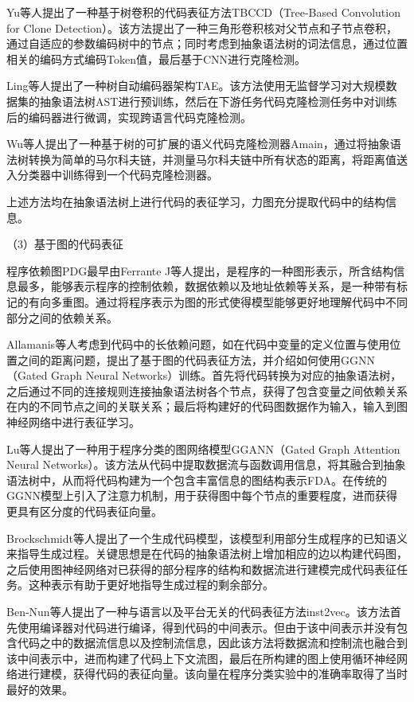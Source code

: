 Yu等人\cite{8813290}提出了一种基于树卷积的代码表征方法TBCCD（Tree-Based Convolution for Clone Detection）。该方法提出了一种三角形卷积核对父节点和子节点卷积，通过自适应的参数编码树中的节点；同时考虑到抽象语法树的词法信息，通过位置相关的编码方式编码Token值，最后基于CNN进行克隆检测。

Ling等人\cite{Ling2022ImproveRF}提出了一种树自动编码器架构TAE。该方法使用无监督学习对大规模数据集的抽象语法树AST进行预训练，然后在下游任务代码克隆检测任务中对训练后的编码器进行微调，实现跨语言代码克隆检测。

Wu等人\cite{10.1145/3551349.3560426}提出了一种基于树的可扩展的语义代码克隆检测器Amain，通过将抽象语法树转换为简单的马尔科夫链，并测量马尔科夫链中所有状态的距离，将距离值送入分类器中训练得到一个代码克隆检测器。

上述方法均在抽象语法树上进行代码的表征学习，力图充分提取代码中的结构信息。

（3）基于图的代码表征

程序依赖图PDG最早由Ferrante J等人\cite{10.1145/24039.24041}提出，是程序的一种图形表示，所含结构信息最多，能够表示程序的控制依赖，数据依赖以及地址依赖等关系，是一种带有标记的有向多重图。通过将程序表示为图的形式使得模型能够更好地理解代码中不同部分之间的依赖关系。

Allamanis等人\cite{Allamanis2017LearningTR}考虑到代码中的长依赖问题，如在代码中变量的定义位置与使用位置之间的距离问题，提出了基于图的代码表征方法，并介绍如何使用GGNN（Gated Graph Neural Networks）训练。首先将代码转换为对应的抽象语法树，之后通过不同的连接规则连接抽象语法树各个节点，获得了包含变量之间依赖关系在内的不同节点之间的关联关系；最后将构建好的代码图数据作为输入，输入到图神经网络中进行表征学习。

Lu等人\cite{Lu2019ProgramCU}提出了一种用于程序分类的图网络模型GGANN（Gated Graph Attention Neural Networks）。该方法从代码中提取数据流与函数调用信息，将其融合到抽象语法树中，从而将代码构建为一个包含丰富信息的图结构表示FDA。在传统的GGNN模型上引入了注意力机制，用于获得图中每个节点的重要程度，进而获得更具有区分度的代码表征向量。

Brockschmidt等人\cite{Brockschmidt2018GenerativeCM}提出了一个生成代码模型，该模型利用部分生成程序的已知语义来指导生成过程。关键思想是在代码的抽象语法树上增加相应的边以构建代码图，之后使用图神经网络对已获得的部分程序的结构和数据流进行建模完成代码表征任务。这种表示有助于更好地指导生成过程的剩余部分。

Ben-Nun等人\cite{10.5555/3327144.3327276}提出了一种与语言以及平台无关的代码表征方法inst2vec。该方法首先使用编译器对代码进行编译，得到代码的中间表示。但由于该中间表示并没有包含代码之中的数据流信息以及控制流信息，因此该方法将数据流和控制流也融合到该中间表示中，进而构建了代码上下文流图，最后在所构建的图上使用循环神经网络进行建模，获得代码的表征向量。该向量在程序分类实验中的准确率取得了当时最好的效果。

